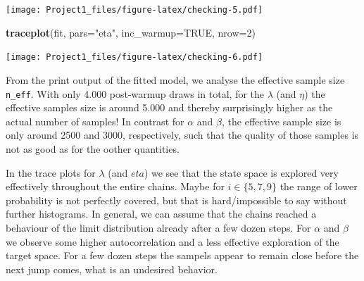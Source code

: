 \documentclass[
]{article}
\newenvironment{Shaded}{\begin{snugshade}}{\end{snugshade}}
\newcommand{\DataTypeTok}[1]{\textcolor[rgb]{0.13,0.29,0.53}{#1}}
\newcommand{\DecValTok}[1]{\textcolor[rgb]{0.00,0.00,0.81}{#1}}
\newcommand{\KeywordTok}[1]{\textcolor[rgb]{0.13,0.29,0.53}{\textbf{#1}}}
\newcommand{\NormalTok}[1]{#1}
\newcommand{\OtherTok}[1]{\textcolor[rgb]{0.56,0.35,0.01}{#1}}
\newcommand{\StringTok}[1]{\textcolor[rgb]{0.31,0.60,0.02}{#1}}
\begin{document}
\texttt{[image: Project1\_files/figure-latex/checking-5.pdf]}

\begin{Shaded}
\begin{Highlighting}[]
\KeywordTok{traceplot}\NormalTok{(fit, }\DataTypeTok{pars=}\StringTok{"eta"}\NormalTok{, }\DataTypeTok{inc_warmup=}\OtherTok{TRUE}\NormalTok{, }\DataTypeTok{nrow=}\DecValTok{2}\NormalTok{)}
\end{Highlighting}
\end{Shaded}

\texttt{[image: Project1\_files/figure-latex/checking-6.pdf]}

From the print output of the fitted model, we analyse the effective
sample size \texttt{n\_eff}. With only 4.000 post-warmup draws in total,
for the \(\lambda\) (and \(\eta\)) the effective samples size is around
5.000 and thereby surprisingly higher as the actual number of samples!
In contrast for \(\alpha\) and \(\beta\), the effective sample size is
only around 2500 and 3000, respectively, such that the quality of those
samples is not as good as for the oother quantities.

In the trace plots for \(\lambda\) (and \(eta\)) we see that the state
space is explored very effectively throughout the entire chains. Maybe
for \(i\in\{5,7,9\}\) the range of lower probability is not perfectly
covered, but that is hard/impossible to say without further histograms.
In general, we can assume that the chains reached a behaviour of the
limit distribution already after a few dozen steps. For \(\alpha\) and
\(\beta\) we observe some higher autocorrelation and a less effective
exploration of the target space. For a few dozen steps the sampels
appear to remain close before the next jump comes, what is an undesired
behavior.
\end{document}
